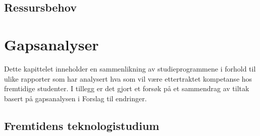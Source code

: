 \documentclass[a4paper, oneside, 12pt]{memoir}
\begin{document}

\section{Ressursbehov}


\chapter{Gapsanalyser}

Dette kapittelet inneholder en sammenlikning av studieprogrammene i forhold til ulike rapporter som har analysert hva som vil være ettertraktet kompetanse hos fremtidige studenter. I tillegg er det gjort et forsøk på et sammendrag av tiltak basert på gapsanalysen i Forslag til endringer.



\section{Fremtidens teknologistudium}
	
	







\end{document}
